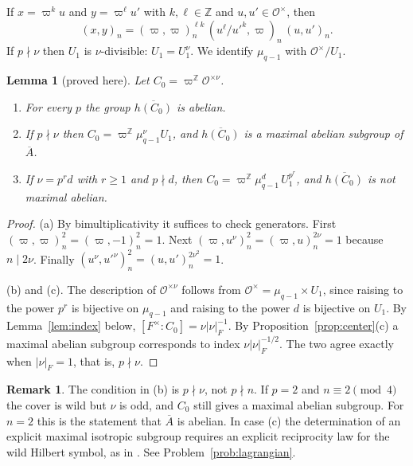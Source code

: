 \documentclass[12pt,letterpaper]{article}
\numberwithin{equation}{section}
\newtheorem{lemma}[theorem]{Lemma}
\theoremstyle{definition}
\newtheorem{xremark}[theorem]{Remark}
\newcommand{\proved}{proved here}
\newcommand{\Z}{\mathbb Z}
\newcommand{\OF}{\mathcal O}
\newcommand{\vp}{\varpi}
\newcommand{\bA}{\overline{A}}
\begin{document}
If $x=\vp^ku$ and $y=\vp^\ell u'$ with $k,\ell\in\Z$ and $u,u'\in\OF^\times$, then
\begin{equation}\label{eq:symbol-expand}
(x,y)_n=(\vp,\vp)_n^{\ell k}\,(u^\ell/u'^k,\vp)_n\,(u,u')_n .
\end{equation}
If $p\nmid\nu$ then $U_1$ is $\nu$-divisible: $U_1=U_1^\nu$.  We identify $\mu_{q-1}$ with
$\OF^\times/U_1$.

\begin{lemma}[\proved]\label{lem:C-tame}
Let $C_0=\vp^{\Z}\OF^{\times\nu}$.
\begin{enumerate}[label=(\alph*),leftmargin=*,itemsep=1pt]
\item For every $p$ the group $\overline{h(C_0)}$ is abelian.
\item If $p\nmid\nu$ then $C_0=\vp^{\Z}\mu_{q-1}^{\nu}U_1$, and $\overline{h(C_0)}$ is a
maximal abelian subgroup of $\bA$.
\item If $\nu=p^rd$ with $r\ge1$ and $p\nmid d$, then
$C_0=\vp^{\Z}\mu_{q-1}^{d}\,U_1^{p^r}$, and $\overline{h(C_0)}$ is not maximal abelian.
\end{enumerate}
\end{lemma}
\begin{proof}
(a) By bimultiplicativity it suffices to check generators.  First
$(\vp,\vp)_n^2=(\vp,-1)_n^2=1$.  Next $(\vp,u^\nu)_n^2=(\vp,u)_n^{2\nu}=1$ because $n\mid2\nu$.
Finally $(u^\nu,u'^\nu)_n^2=(u,u')_n^{2\nu^2}=1$.

(b) and (c).  The description of $\OF^{\times\nu}$ follows from
$\OF^\times=\mu_{q-1}\times U_1$, since raising to the power $p^r$ is bijective on
$\mu_{q-1}$ and raising to the power $d$ is bijective on $U_1$.  By
Lemma~\ref{lem:index} below, $[F^\times:C_0]=\nu|\nu|_F^{-1}$.  By
Proposition~\ref{prop:center}(c) a maximal abelian subgroup corresponds to index
$\nu|\nu|_F^{-1/2}$.  The two agree exactly when $|\nu|_F=1$, that is, $p\nmid\nu$.
\end{proof}

\begin{xremark}
The condition in (b) is $p\nmid\nu$, not $p\nmid n$.  If $p=2$ and $n\equiv2\pmod4$ the
cover is wild but $\nu$ is odd, and $C_0$ still gives a maximal abelian subgroup.  For
$n=2$ this is the statement that $\bA$ is abelian.  In case (c) the determination of an
explicit maximal isotropic subgroup requires an explicit reciprocity law for the wild
Hilbert symbol, as in \cite{Se81}.  See Problem~\ref{prob:lagrangian}.
\end{xremark}
\end{document}
